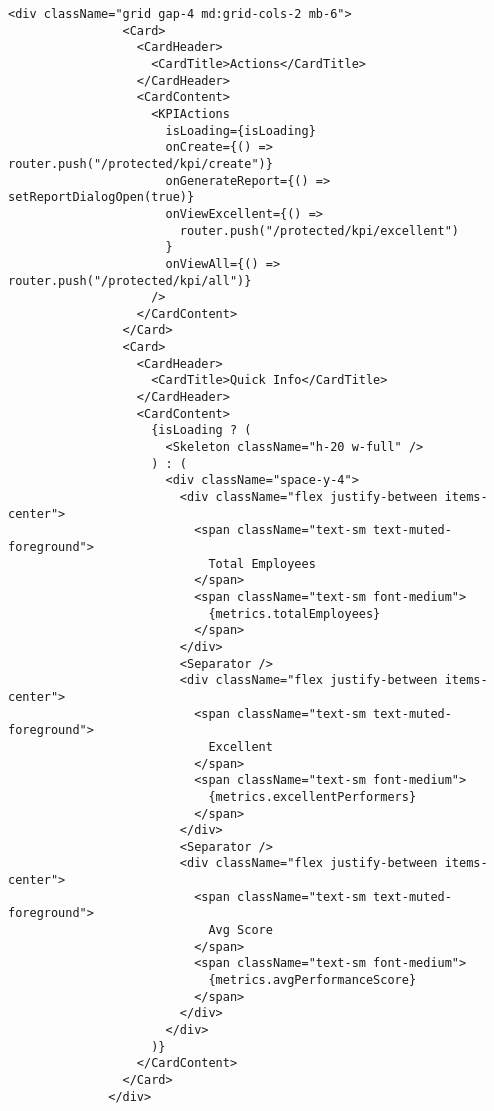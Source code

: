 \begin{lstlisting}[language=Golang, caption=Routes, frame=single]
              <div className="grid gap-4 md:grid-cols-2 mb-6">
                <Card>
                  <CardHeader>
                    <CardTitle>Actions</CardTitle>
                  </CardHeader>
                  <CardContent>
                    <KPIActions
                      isLoading={isLoading}
                      onCreate={() => router.push("/protected/kpi/create")}
                      onGenerateReport={() => setReportDialogOpen(true)}
                      onViewExcellent={() =>
                        router.push("/protected/kpi/excellent")
                      }
                      onViewAll={() => router.push("/protected/kpi/all")}
                    />
                  </CardContent>
                </Card>
                <Card>
                  <CardHeader>
                    <CardTitle>Quick Info</CardTitle>
                  </CardHeader>
                  <CardContent>
                    {isLoading ? (
                      <Skeleton className="h-20 w-full" />
                    ) : (
                      <div className="space-y-4">
                        <div className="flex justify-between items-center">
                          <span className="text-sm text-muted-foreground">
                            Total Employees
                          </span>
                          <span className="text-sm font-medium">
                            {metrics.totalEmployees}
                          </span>
                        </div>
                        <Separator />
                        <div className="flex justify-between items-center">
                          <span className="text-sm text-muted-foreground">
                            Excellent
                          </span>
                          <span className="text-sm font-medium">
                            {metrics.excellentPerformers}
                          </span>
                        </div>
                        <Separator />
                        <div className="flex justify-between items-center">
                          <span className="text-sm text-muted-foreground">
                            Avg Score
                          </span>
                          <span className="text-sm font-medium">
                            {metrics.avgPerformanceScore}
                          </span>
                        </div>
                      </div>
                    )}
                  </CardContent>
                </Card>
              </div>
    

\end{lstlisting}
